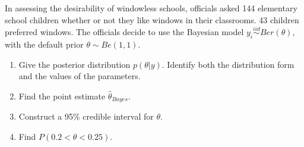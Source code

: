   \item 
    In assessing the desirability of windowless schools, officials asked 144
    elementary school children whether or not they like windows in their
    classrooms. 43 children preferred windows. The officials decide to use the Bayesian model $y_i\stackrel{iid}{\sim}Ber(\theta)$, with the default prior $\theta \sim Be(1,1)$.
    \begin{enumerate}
      \item Give the posterior distribution $ p(\theta | y)$. Identify both the distribution form and the values of the parameters. 
      \item Find the point estimate $\hat{\theta}_{Bayes}$. 
      \item Construct a 95\% credible interval for $\theta$. 
      \item Find $P(0.2<\theta<0.25)$.
\end{enumerate}

